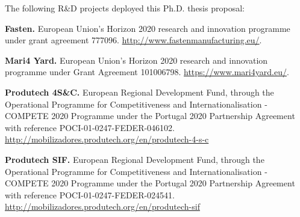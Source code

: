 
The following R\&D projects deployed this Ph.D. thesis proposal:

\begin{comment} %
\begin{itemize_jp}
    \item \textbf{Fasten:} Flexible  and  Autonomous  Manufacturing  Systems  for  Custom-Designed Products. \url{http://www.fastenmanufacturing.eu/}. European Union’s Horizon 2020 research and innovation programme under grant agreement 777096.
    \item \textbf{Mari4 Yard:} Leverages the potential of Internet of Things (IoT), mobile and ubiquitous ICT tools, and robotics to develop user-centric solutions for flexible and modular manufactoring and thus implement a novel connectes shipyard. \url{https://www.mari4yard.eu/}. European Union’s Horizon 2020 research and innovation programme under Grant Agreement 101006798.
    \item \textbf{Produtech 4S\&C:} \url{http://mobilizadores.produtech.org/en/produtech-4-s-c?set_language=en}
    
    \item \textbf{Produtech SIF:} \url{http://mobilizadores.produtech.org/en/produtech-sif}
\end{itemize_jp}
\end{comment} %



\begin{itemize_jp}
    \item \textbf{Fasten.} European Union’s Horizon 2020 research and innovation programme under grant agreement 777096. \url{http://www.fastenmanufacturing.eu/}.
    \item \textbf{Mari4 Yard.}  European Union’s Horizon 2020 research and innovation programme under Grant Agreement 101006798. \url{https://www.mari4yard.eu/}.
    \item \textbf{Produtech 4S\&C.}   European Regional Development Fund, through the Operational Programme for Competitiveness and Internationalisation - COMPETE 2020 Programme under the Portugal 2020 Partnership Agreement with reference POCI-01-0247-FEDER-046102. \url{http://mobilizadores.produtech.org/en/produtech-4-s-c}
    
    \item \textbf{Produtech SIF.} European Regional Development Fund, through the Operational Programme for Competitiveness and Internationalisation - COMPETE 2020 Programme under the Portugal 2020 Partnership Agreement with reference POCI-01-0247-FEDER-024541. \url{http://mobilizadores.produtech.org/en/produtech-sif}
\end{itemize_jp}



